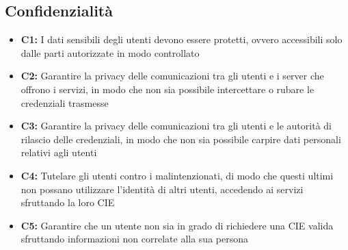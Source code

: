     
    \subsection{Confidenzialità}
        \begin{itemize}
            \item \textbf{C1:} I dati sensibili degli utenti devono essere protetti, ovvero accessibili solo dalle parti autorizzate in modo controllato
            
            \item \textbf{C2:} Garantire la privacy delle comunicazioni tra gli utenti e i server che offrono i servizi, in modo che non sia possibile intercettare o rubare le credenziali trasmesse

            \item \textbf{C3:} Garantire la privacy delle comunicazioni tra gli utenti e le autorità di rilascio delle credenziali, in modo che non sia possibile carpire dati personali relativi agli utenti
            
            \item \textbf{C4:} Tutelare gli utenti contro i malintenzionati, di modo che questi ultimi non possano utilizzare l'identità di altri utenti, accedendo ai servizi sfruttando la loro CIE

            \item \textbf{C5:} Garantire che un utente non sia in grado di richiedere una CIE valida sfruttando informazioni non correlate alla sua persona
        \end{itemize}



